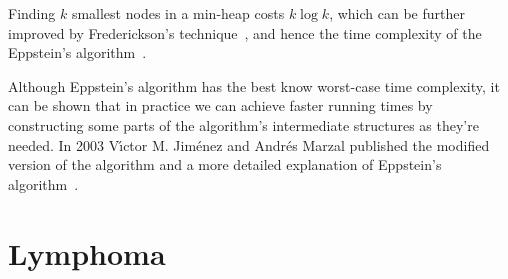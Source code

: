 Finding $k$ smallest nodes in a min-heap costs $k\log k$, which can be further improved by Frederickson's technique~\cite{frederickson1993optimal}, and hence the time complexity of the Eppstein's algorithm~\cite[Lemma 7]{eppstein1998finding}.

Although Eppstein's algorithm has the best know worst-case time complexity, it can be shown that in practice we can achieve faster running times by constructing some parts of the algorithm's intermediate structures as they're needed. In 2003 V{\'\i}ctor M. Jim{\'e}nez and Andr{\'e}s Marzal published the modified version of the algorithm and a more detailed explanation of Eppstein's algorithm~\cite{jimenez2003lazy}.
\section{Lymphoma}

